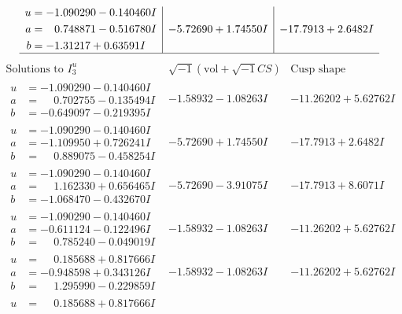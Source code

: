\documentclass[1p]{elsarticle_modified}
\theoremstyle{definition}
\newcommand{\I}{\sqrt{-1}}
\begin{document}
$$\begin{array}{c|c|c}
\begin{aligned}
u &= -1.090290 - 0.140460 I \\
a &= \phantom{-}0.748871 - 0.516780 I \\
b &= -1.31217 + 0.63591 I\end{aligned}
 & -5.72690 + 1.74550 I & -17.7913 + 2.6482 I\\
 \hline 
 \end{array}$$\newpage$$\begin{array}{c|c|c}  
\text{Solutions to }I^u_{3}& \I (\text{vol} + \sqrt{-1}CS) & \text{Cusp shape}\\
 \hline 
\begin{aligned}
u &= -1.090290 - 0.140460 I \\
a &= \phantom{-}0.702755 - 0.135494 I \\
b &= -0.649097 - 0.219395 I\end{aligned}
 & -1.58932 - 1.08263 I & -11.26202 + 5.62762 I \\ \hline\begin{aligned}
u &= -1.090290 - 0.140460 I \\
a &= -1.109950 + 0.726241 I \\
b &= \phantom{-}0.889075 - 0.458254 I\end{aligned}
 & -5.72690 + 1.74550 I & -17.7913 + 2.6482 I \\ \hline\begin{aligned}
u &= -1.090290 - 0.140460 I \\
a &= \phantom{-}1.162330 + 0.656465 I \\
b &= -1.068470 - 0.432670 I\end{aligned}
 & -5.72690 - 3.91075 I & -17.7913 + 8.6071 I \\ \hline\begin{aligned}
u &= -1.090290 - 0.140460 I \\
a &= -0.611124 - 0.122496 I \\
b &= \phantom{-}0.785240 - 0.049019 I\end{aligned}
 & -1.58932 - 1.08263 I & -11.26202 + 5.62762 I \\ \hline\begin{aligned}
u &= \phantom{-}0.185688 + 0.817666 I \\
a &= -0.948598 + 0.343126 I \\
b &= \phantom{-}1.295990 - 0.229859 I\end{aligned}
 & -1.58932 - 1.08263 I & -11.26202 + 5.62762 I \\ \hline\begin{aligned}
u &= \phantom{-}0.185688 + 0.817666 I \\

\end{aligned}
\end{array}$$
\end{document}
